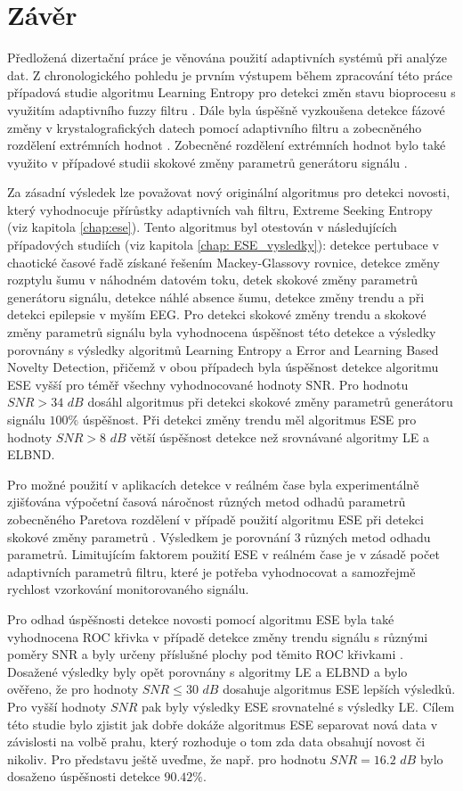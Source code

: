 \chapter{Závěr}
Předložená dizertační práce je věnována použití adaptivních systémů při analýze dat. Z chronologického pohledu je prvním výstupem během zpracování této práce případová studie algoritmu Learning Entropy pro detekci změn stavu bioprocesu s využitím adaptivního fuzzy filtru \cite{artep}. Dále byla úspěšně vyzkoušena detekce fázové změny v krystalografických datech pomocí adaptivního filtru a zobecněného rozdělení extrémních hodnot \cite{asr}. Zobecněné rozdělení extrémních hodnot bylo také využito v případové studii skokové změny parametrů generátoru signálu \cite{appel1}. 
\par 
Za zásadní výsledek lze považovat nový originální algoritmus pro detekci novosti, který vyhodnocuje přírůstky adaptivních vah filtru, Extreme Seeking Entropy \cite{ese_mdpi} (viz kapitola \ref{chap:ese}). Tento algoritmus byl otestován v následujících případových studiích (viz kapitola \ref{chap: ESE_vysledky}): detekce pertubace v chaotické časové řadě získané řešením Mackey-Glassovy rovnice, detekce změny rozptylu šumu v náhodném datovém toku, detek skokové změny parametrů generátoru signálu, detekce náhlé absence šumu, detekce změny trendu a při detekci epilepsie v myším EEG. Pro detekci skokové změny trendu a skokové změny parametrů signálu byla vyhodnocena úspěšnost této detekce a výsledky porovnány s výsledky algoritmů Learning Entropy a Error and Learning Based Novelty Detection, přičemž v obou případech byla úspěšnost detekce algoritmu ESE vyšší pro téměř všechny vyhodnocované hodnoty SNR. Pro hodnotu $SNR>34$ $dB$ dosáhl algoritmus při detekci skokové změny parametrů generátoru signálu $100\%$ úspěšnost. Při detekci změny trendu měl algoritmus ESE pro hodnoty $SNR>8$ $dB$ větší úspěšnost detekce než srovnávané algoritmy LE a ELBND. 
\par Pro možné použití v aplikacích detekce v reálném čase byla experimentálně zjišťována výpočetní časová náročnost různých metod odhadů parametrů zobecněného Paretova rozdělení v případě použití algoritmu ESE při detekci skokové změny parametrů \cite{appel2}. Výsledkem je porovnání 3 různých metod odhadu parametrů. Limitujícím faktorem použití ESE v reálném čase je v zásadě počet adaptivních parametrů filtru, které je potřeba vyhodnocovat a samozřejmě rychlost vzorkování monitorovaného signálu.
\par Pro odhad úspěšnosti detekce novosti pomocí algoritmu ESE byla také vyhodnocena ROC křivka v případě detekce změny trendu signálu s různými poměry SNR a byly určeny příslušné plochy pod těmito ROC křivkami \cite{appel3}. Dosažené výsledky byly opět porovnány s algoritmy LE a ELBND a bylo ověřeno, že pro hodnoty $SNR \leq 30$ $dB$ dosahuje algoritmus ESE lepších výsledků. Pro vyšší hodnoty $SNR$ pak byly výsledky ESE srovnatelné s výsledky LE.  Cílem této studie bylo zjistit jak dobře dokáže algoritmus ESE separovat nová data v závislosti na volbě prahu, který rozhoduje o tom zda data obsahují novost či nikoliv. Pro představu ještě uveďme, že např. pro hodnotu $SNR=16.2$ $dB$ bylo dosaženo úspěšnosti detekce $90.42\%$.
